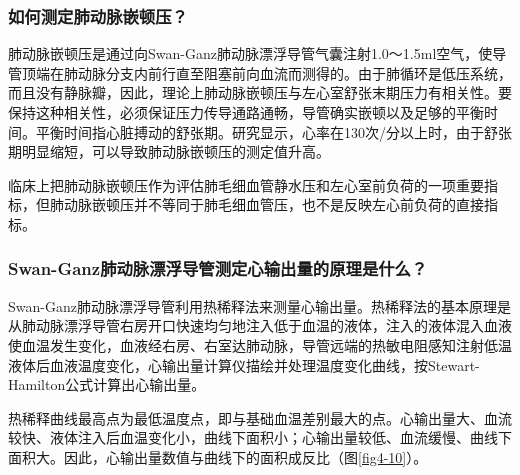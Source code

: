 \subsubsection{如何测定肺动脉嵌顿压？}

肺动脉嵌顿压是通过向Swan-Ganz肺动脉漂浮导管气囊注射1.0～1.5ml空气，使导管顶端在肺动脉分支内前行直至阻塞前向血流而测得的。由于肺循环是低压系统，而且没有静脉瓣，因此，理论上肺动脉嵌顿压与左心室舒张末期压力有相关性。要保持这种相关性，必须保证压力传导通路通畅，导管确实嵌顿以及足够的平衡时间。平衡时间指心脏搏动的舒张期。研究显示，心率在130次/分以上时，由于舒张期明显缩短，可以导致肺动脉嵌顿压的测定值升高。

临床上把肺动脉嵌顿压作为评估肺毛细血管静水压和左心室前负荷的一项重要指标，但肺动脉嵌顿压并不等同于肺毛细血管压，也不是反映左心前负荷的直接指标。

\subsubsection{Swan-Ganz肺动脉漂浮导管测定心输出量的原理是什么？}

Swan-Ganz肺动脉漂浮导管利用热稀释法来测量心输出量。热稀释法的基本原理是从肺动脉漂浮导管右房开口快速均匀地注入低于血温的液体，注入的液体混入血液使血温发生变化，血液经右房、右室达肺动脉，导管远端的热敏电阻感知注射低温液体后血液温度变化，心输出量计算仪描绘并处理温度变化曲线，按Stewart-Hamilton公式计算出心输出量。

热稀释曲线最高点为最低温度点，即与基础血温差别最大的点。心输出量大、血流较快、液体注入后血温变化小，曲线下面积小；心输出量较低、血流缓慢、曲线下面积大。因此，心输出量数值与曲线下的面积成反比（图\ref{fig4-10}）。


